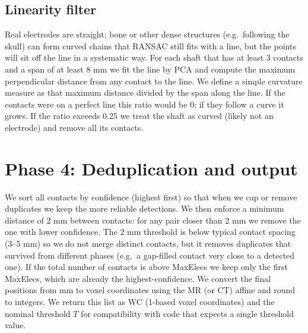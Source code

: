 \documentclass[11pt,a4paper]{article}
\begin{document}
\subsection{Linearity filter}
Real electrodes are straight; bone or other dense structures (e.g.\ following the skull) can form curved chains that RANSAC still fits with a line, but the points will sit off the line in a systematic way. For each shaft that has at least 3 contacts and a span of at least 8 mm we fit the line by PCA and compute the maximum perpendicular distance from any contact to the line. We define a simple curvature measure as that maximum distance divided by the span along the line. If the contacts were on a perfect line this ratio would be 0; if they follow a curve it grows. If the ratio exceeds 0.25 we treat the shaft as curved (likely not an electrode) and remove all its contacts.

\section{Phase 4: Deduplication and output}
\label{sec:phase4}

We sort all contacts by confidence (highest first) so that when we cap or remove duplicates we keep the more reliable detections. We then enforce a minimum distance of 2 mm between contacts: for any pair closer than 2 mm we remove the one with lower confidence. The 2 mm threshold is below typical contact spacing (3--5 mm) so we do not merge distinct contacts, but it removes duplicates that survived from different phases (e.g.\ a gap-filled contact very close to a detected one). If the total number of contacts is above MaxElecs we keep only the first MaxElecs, which are already the highest-confidence. We convert the final positions from mm to voxel coordinates using the MR (or CT) affine and round to integers. We return this list as WC (1-based voxel coordinates) and the nominal threshold \(T\) for compatibility with code that expects a single threshold value.
\end{document}
